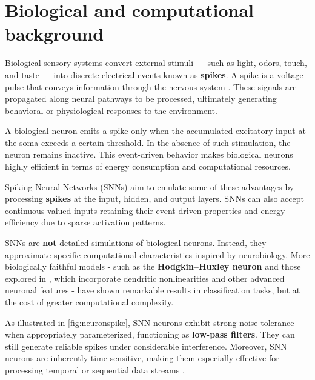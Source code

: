 \section*{Biological and computational background}
\label{sec:fundamentals}

	\par Biological sensory systems convert external stimuli — such as light, odors, touch, and taste — into discrete electrical events known as \textbf{spikes}. A spike is a voltage pulse that conveys information through the nervous system \cite{kasabov2019time}. These signals are propagated along neural pathways to be processed, ultimately generating behavioral or physiological responses to the environment.
	
	\par A biological neuron emits a spike only when the accumulated excitatory input at the soma exceeds a certain threshold. In the absence of such stimulation, the neuron remains inactive. This event-driven behavior makes biological neurons highly efficient in terms of energy consumption and computational resources.
	
	\par Spiking Neural Networks (SNNs) aim to emulate some of these advantages by processing \textbf{spikes} at the input, hidden, and output layers. SNNs can also accept continuous-valued inputs retaining their event-driven properties and energy efficiency due to sparse activation patterns.
	
	\par SNNs are \textbf{not} detailed simulations of biological neurons. Instead, they approximate specific computational characteristics inspired by neurobiology. More biologically faithful models - such as the \textbf{Hodgkin–Huxley neuron} \cite{gerstner2014neuronal} and those explored in \cite{jones2020single}, which incorporate dendritic nonlinearities and other advanced neuronal features - have shown remarkable results in classification tasks, but at the cost of greater computational complexity.
	
	\par As illustrated in \autoref{fig:neuronspike}, SNN neurons exhibit strong noise tolerance when appropriately parameterized, functioning as \textbf{low-pass filters}. They can still generate reliable spikes under considerable interference. Moreover, SNN neurons are inherently time-sensitive, making them especially effective for processing temporal or sequential data streams \cite{10242251}.

